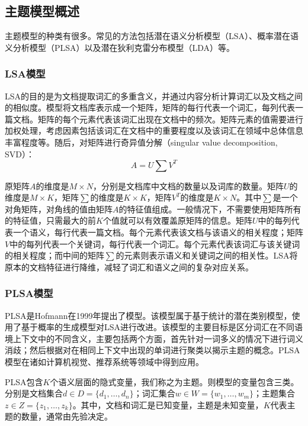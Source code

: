 \subsection{主题模型概述}

主题模型的种类有很多。常见的方法包括潜在语义分析模型（LSA）、概率潜在语义分析模型（PLSA）以及潜在狄利克雷分布模型（LDA）等。

\subsubsection{LSA模型}
LSA\cite{deerwester1990indexing}的目的是为文档提取词汇的多重含义，并通过内容分析计算词汇以及文档之间的相似度。模型将文档库表示成一个矩阵，矩阵的每行代表一个词汇，每列代表一篇文档。矩阵的每个元素代表该词汇出现在文档中的频次。矩阵元素的值需要进行加权处理，考虑因素包括该词汇在文档中的重要程度以及该词汇在领域中总体信息丰富程度等。随后，对矩阵进行奇异值分解（singular value decomposition, SVD）\cite{golub1970singular}：
\begin{equation}
	A = U\sum V^T
\end{equation}

原矩阵$A$的维度是$M \times N$，分别是文档库中文档的数量以及词库的数量。矩阵$U$的维度是$M \times K$，矩阵$\sum$的维度是$K \times K$，矩阵$V^T$的维度是$K \times N$。其中$\sum$是一个对角矩阵，对角线的值由矩阵$A$的特征值组成。一般情况下，不需要使用矩阵所有的特征值，只需最大的前$K$个值就可以有效覆盖原矩阵的信息。矩阵$U$中的每列代表一个语义，每行代表一篇文档。每个元素代表该文档与该语义的相关程度；矩阵$V$中的每列代表一个关键词，每行代表一个词汇。每个元素代表该词汇与该关键词的相关程度；而中间的矩阵$\sum$的元素则表示语义和关键词之间的相关性。LSA将原本的文档特征进行降维，减轻了词汇和语义之间的复杂对应关系。

\subsubsection{PLSA模型}
PLSA是Hofmann\cite{hofmann1999probabilistic}在1999年提出了模型。该模型属于基于统计的潜在类别模型，使用了基于概率的生成模型对LSA进行改进。该模型的主要目标是区分词汇在不同语境上下文中的不同含义，主要包括两个方面，首先针对一词多义的情况下进行词义消歧；然后根据对在相同上下文中出现的单词进行聚类以揭示主题的概念。PLSA模型在诸如计算机视觉、推荐系统等领域中得到应用。

PLSA包含$K$个语义层面的隐式变量，我们称之为主题。则模型的变量包含三类。分别是文档集合$d \in D = \{d_1, \dots, d_n\}$；词汇集合$w \in W = \{w_1, \dots, w_m\}$；主题集合$z \in Z = \{z_1, \dots, z_k\}$。其中，文档和词汇是已知变量，主题是未知变量，$K$代表主题的数量，通常由先验决定。

